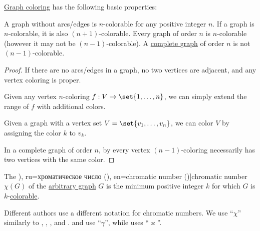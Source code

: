 \begin{proposition}\label{thm:def:graph_coloring}
  \hyperref[def:n_partite_graph]{Graph coloring} has the following basic properties:
  \begin{thmenum}
     A graph without arcs/edges is \( n \)-colorable for any positive integer \( n \).
     If a graph is \( n \)-colorable, it is also \( (n + 1) \)-colorable.
     Every graph of order \( n \) is \( n \)-colorable (however it may not be \( (n - 1) \)-colorable).
     A \hyperref[def:complete_graph]{complete graph} of order \( n \) is not \( (n - 1) \)-colorable.
  \end{thmenum}
\end{proposition}
\begin{proof}
   If there are no arcs/edges in a graph, no two vertices are adjacent, and any vertex coloring is proper.

   Given any vertex \( n \)-coloring \( f: V \to \set{ 1, \ldots, n } \), we can simply extend the range of \( f \) with additional colors.

   Given a graph with a vertex set \( V = \set{ v_1, \ldots, v_n } \), we can color \( V \) by assigning the color \( k \) to \( v_k \).

   In a complete graph of order \( n \), by  every vertex \( (n - 1) \)-coloring necessarily has two vertices with the same color.
\end{proof}

\begin{definition}\label{def:chromatic_number}
  The \term[bg=хроматично число (\cite[142]{Мирчев2001}), ru=хроматическое число (\cite[28]{Зыков2004}), en=chromatic number (\cite[122]{Diestel2005})]{chromatic number} \( \chi(G) \) of the \hyperref[rem:arbitrary_graph]{arbitrary graph} \( G \) is the minimum positive integer \( k \) for which \( G \) is \( k \)-\hyperref[def:graph_coloring/colorable]{colorable}.
\end{definition}
\begin{comments}
  \item Different authors use a different notation for chromatic numbers. We use \enquote{\( \chi \)} similarly to , , ,  and .  and  use \enquote{\( \gamma \)}, while  uses \enquote{\( \varkappa \)}.
\end{comments}

